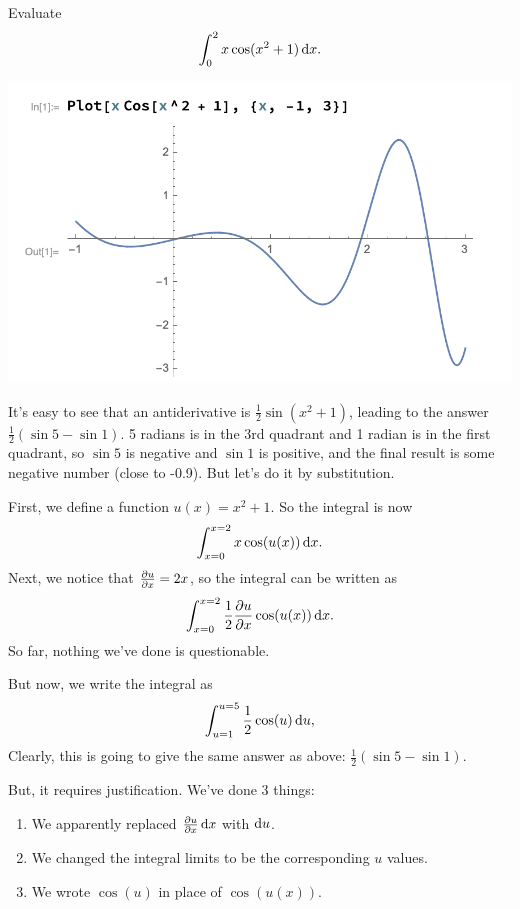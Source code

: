 \begin{example}
  Evaluate
  \begin{align*}
    \int_{0}^{2} x\cos(x^2 + 1) \dx.
  \end{align*}
  \begin{mdframed}
   \includegraphics[width=400pt]{img/calculus-integration-by-substitution-example-1.png}
  \end{mdframed}

  It's easy to see that an antiderivative is $\frac{1}{2}\sin(x^2 + 1)$, leading to the answer
  $\frac{1}{2}(\sin 5 - \sin 1)$. 5 radians is in the 3rd quadrant and 1 radian is in the first
  quadrant, so $\sin 5$ is negative and $\sin 1$ is positive, and the final result is some negative
  number (close to -0.9). But let's do it by substitution.

  First, we define a function $u(x) = x^2 + 1$. So the integral is now
  \begin{align*}
    \int_{x=0}^{x=2} x\cos(u(x)) \dx.
  \end{align*}
  Next, we notice that $\frac{\partial u}{\partial x} = 2x$, so the integral can be written as
  \begin{align}
    \int_{x=0}^{x=2} \frac{1}{2} \dudx \cos(u(x)) \dx. \label{int-by-subst-ex1-1}
  \end{align}
  So far, nothing we've done is questionable.

  But now, we write the integral as
  \begin{align*}
    \int_{u=1}^{u=5} \frac{1}{2} \cos(u) \du,
  \end{align*}
  Clearly, this is going to give the same answer as above: $\frac{1}{2}(\sin 5 - \sin 1)$.

  But, it requires justification. We've done 3 things:
  \begin{enumerate}
  \item We apparently replaced $\dudx \dx$ with $\du$.
  \item We changed the integral limits to be the corresponding $u$ values.
  \item We wrote $\cos(u)$ in place of $\cos(u(x))$.
  \end{enumerate}


\end{example}
